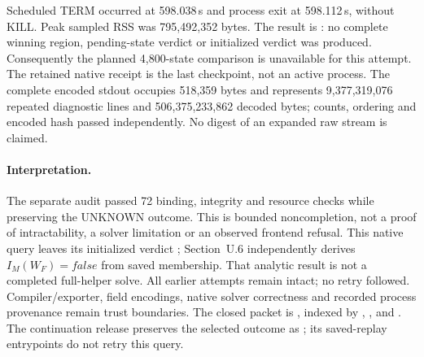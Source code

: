 Scheduled TERM occurred at 598.038\,s and process exit at 598.112\,s,
without KILL. Peak sampled RSS was 795,492,352 bytes. The result is
: no complete winning region, pending-state
verdict or initialized verdict was produced. Consequently the planned
4,800-state comparison is unavailable for this attempt. The retained
 native receipt is the last checkpoint, not an active
process. The complete encoded stdout occupies 518,359 bytes and
represents 9,377,319,076 repeated diagnostic lines and 506,375,233,862
decoded bytes; counts, ordering and encoded hash passed independently.
No digest of an expanded raw stream is claimed.

\paragraph{Interpretation.}
The separate audit passed 72 binding, integrity and resource checks while
preserving the UNKNOWN outcome. This is bounded noncompletion, not a
proof of intractability, a solver limitation or an observed frontend
refusal. This native query leaves its initialized verdict ;
Section~U.6 independently derives $I_M(W_F)=\mathit{false}$ from saved
membership. That analytic result is not a completed full-helper solve.
All earlier attempts remain intact; no retry followed. Compiler/exporter,
field encodings, native solver correctness and recorded process provenance
remain trust boundaries. The closed packet is
, indexed by
, ,  and
.
The continuation release preserves
the selected outcome as ;
its saved-replay entrypoints do not retry this query.
